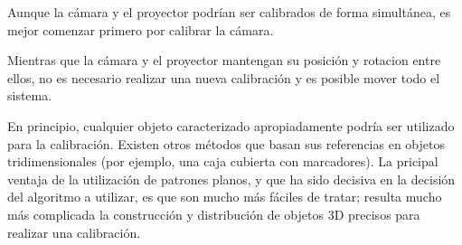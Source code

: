 Aunque la cámara y el proyector podrían ser calibrados de forma simultánea, es mejor comenzar primero por calibrar la cámara.





Mientras que la cámara y el proyector mantengan su posición y rotacion entre ellos, no es necesario realizar una nueva calibración y es posible mover todo el sistema.


En principio, cualquier objeto caracterizado apropiadamente podría ser utilizado para la calibración. Existen otros métodos que basan sus referencias en objetos tridimensionales (por ejemplo, una caja cubierta con marcadores).  
La pricipal ventaja de la utilización de patrones planos, y que ha sido decisiva en la decisión del algoritmo a utilizar, es que son mucho más fáciles de tratar; resulta mucho más complicada la construcción y distribución de objetos 3D precisos para realizar una calibración.

\blindtext
